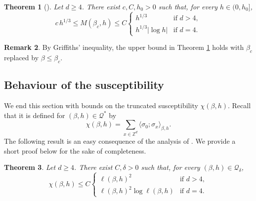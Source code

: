 \documentclass[11pt,a4paper]{article}
\numberwithin{equation}{section}
\theoremstyle{plain}
\newtheorem{Thm}{Theorem}[section]
\theoremstyle{definition}
\newtheorem{Rem}[Thm]{Remark}
\begin{document}
\begin{Thm}[]\label{thm: magnetisation} Let $d\geq 4$. There exist $c,C,h_0>0$ such that, for every $h\in(0,h_0]$,
\begin{equation}
	c\,h^{1/3}\leq M(\beta_c,h)\leq C\left\{
			\begin{array}{ll}
				h^{1/3} & \mbox{if } d>4, \\
				h^{1/3}|\log h| & \mbox{if }d=4.
			\end{array}
			\right.
	\end{equation}
\end{Thm}
\begin{Rem} By Griffiths' inequality, the upper bound in Theorem \ref{thm: magnetisation} holds with $\beta_c$ replaced by $\beta\leq \beta_c$.
\end{Rem}

\subsection{Behaviour of the susceptibility}
We end this section with bounds on the truncated susceptibility $\chi(\beta,h)$. Recall that it is defined for $(\beta,h)\in \mathcal Q^*$ by
\begin{equation}
	\chi(\beta,h)=\sum_{x\in \mathbb Z^d}\langle \sigma_0;\sigma_x\rangle_{\beta,h}.
\end{equation}
The following result is an easy consequence of the analysis of \cite{AizenmanGeometricAnalysis1982,AizenmanGrahamRenormalizedCouplingSusceptibility4d1983,AizenmanFernandezCriticalBehaviorMagnetization1986}. We provide a short proof below for the sake of completeness.
\begin{Thm}\label{thm: susceptibility} Let $d\geq 4$. There exist $C,\delta>0$ such that, for every $(\beta,h)\in \mathcal Q_\delta$,
\begin{equation}
\chi(\beta,h)\leq C\left\{
			\begin{array}{ll}
				\ell(\beta,h)^2 & \mbox{if } d>4, \\
				\ell(\beta,h)^2\log \ell(\beta,h) & \mbox{if }d=4.
			\end{array}
			\right.
\end{equation}
\end{Thm}
\end{document}
